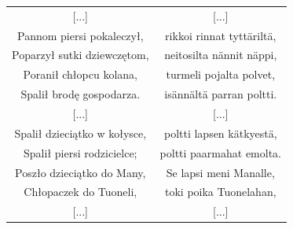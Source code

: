 \documentclass[11pt,a4paper,twoside]{report}
\begin{document}
{\centering
\small
\begin{longtable}{c c}
{[...]} & {[...]}\\
Pannom piersi pokaleczył, & rikkoi rinnat tyttäriltä,\\
Poparzył sutki dziewczętom, & neitosilta nännit näppi,\\
Poranił chłopcu kolana, & turmeli pojalta polvet,\\
Spalił brodę gospodarza. & isännältä parran poltti.\\
{[...]} & {[...]}\\
Spalił dzieciątko w kołysce, & poltti lapsen kätkyestä,\\
Spalił piersi rodzicielce; & poltti paarmahat emolta.\\
Poszło dzieciątko do Many, & Se lapsi meni Manalle,\\
Chłopaczek do Tuoneli, & toki poika Tuonelahan,\\
{[...]} & {[...]}\\
\end{longtable}
}
\newpage
\end{document}
